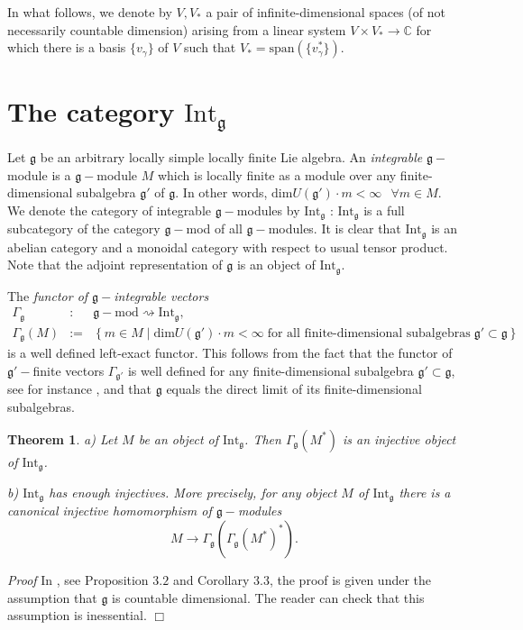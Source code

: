 \documentclass[10pt]{amsart}
\newcounter{theorem}
\newtheorem{theo}{Theorem}[section]
\renewenvironment{proof}{ \emph{Proof}}{$\Box$}
\newcommand {\CC} {\mathbb {C}}
\renewcommand{\gg}{\mathfrak{g}}
\begin{document}
In what follows, we denote by $V, V_*$ a pair of infinite-dimensional spaces (of not necessarily countable dimension) arising from a linear system $V \times V_* \rightarrow \CC$ for which there is a basis $\lbrace v_{\gamma}\rbrace$ of $V$ such that $V_* = \mathrm{span}(\lbrace v_{\gamma}^* \rbrace)$.



\section{The category $\mathrm{Int}_{\gg}$}\label{sect:2} 

Let $\gg$ be an arbitrary locally simple locally finite Lie algebra. An \textit{integrable} $\gg-$module is a $\gg-$module 
$M$ which is locally finite as a module over any finite-dimensional subalgebra $\gg'$ of $\gg$. In other words, $\mathrm{dim}U(\gg')\cdot m < \infty\;\;\, \forall m \in M$. We denote the category of integrable $\gg-$modules by $\mathrm{Int}_{\gg}$ : $\mathrm{Int}_{\gg}$ is a full subcategory of the category $\gg-$mod of all $\gg-$modules. It is clear that $\mathrm{Int}_{\gg}$ is an abelian category and a monoidal category with respect to usual tensor product. Note that the adjoint representation of $\gg$ is an object of $\mathrm{Int}_{\gg}$.

The \textit{functor of $\gg-$integrable vectors}
\begin{eqnarray}\label{func_int_vec}
 \Gamma_{\gg} &:& \gg-\mathrm{mod} \rightsquigarrow \mathrm{Int}_{\gg},\\
\Gamma_{\gg}(M) &:=& \left\lbrace m \in M\; | \;\mathrm{dim}U(\gg')\cdot m < \infty\; \text{for all finite-dimensional subalgebras}\; \gg'\subset \gg\right\rbrace
\end{eqnarray}
is a well defined left-exact functor. This follows from the fact that the functor of $\gg'-$finite vectors $\Gamma_{\gg'}$ is well defined for any finite-dimensional subalgebra $\gg' \subset \gg$, see for instance \cite{Z}, and that $\gg$ equals the direct limit of its finite-dimensional subalgebras. 

\begin{theo}\label{int1}
a) Let $M$ be an object of $\mathrm{Int}_{\gg}$. Then $\Gamma_{\gg}(M^*)$ is an injective object of $\mathrm{Int}_{\gg}$.

b) $\mathrm{Int}_{\gg}$ has enough injectives. More precisely, for any object $M$ of $\mathrm{Int}_{\gg}$ there is a canonical injective homomorphism of $\gg-$modules
\begin{equation}\label{can_inj_hom}
 M \rightarrow \Gamma_{\gg} (\Gamma_{\gg}(M^*)^*).
\end{equation}
\end{theo}
\begin{proof} In \cite{ps}, see Proposition $3.2$ and Corollary $3.3$, the proof is given under the assumption that $\gg$ is countable dimensional. The reader can check that this assumption is inessential.
\end{proof}
\end{document}
